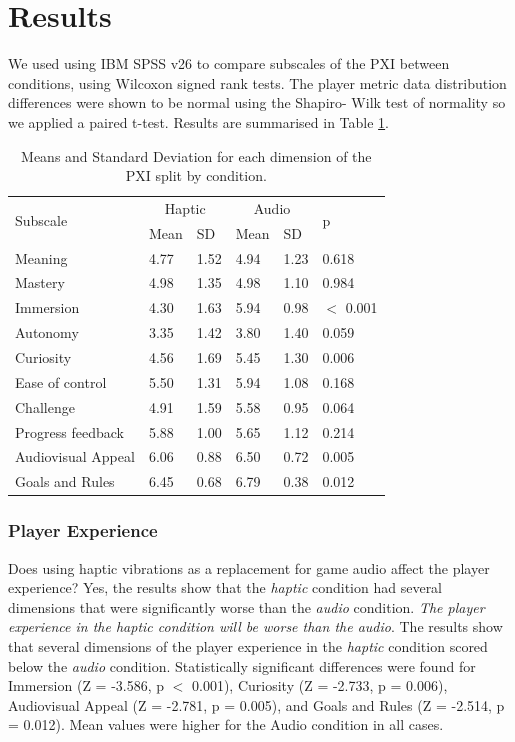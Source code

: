 \documentclass[manuscript,screen]{acmart}
\begin{document}
\section{Results}
We used using IBM SPSS v26 to compare subscales of the PXI between conditions, using Wilcoxon signed rank tests. The player metric data distribution differences were shown to be normal using the Shapiro- Wilk test of normality so we applied a paired t-test. Results are summarised in Table \ref{table:pxi}.


\begin{table}[]
\caption{Means and Standard Deviation for each dimension of the PXI split by condition.}
\label{table:pxi}
\begin{tabular}{|l|l|l|l|l|l|}
\hline
\multirow{2}{*}{Subscale} & \multicolumn{2}{|c|}{Haptic} & \multicolumn{2}{|c|}{Audio} & \multirow{2}{*}{p} \\
\cline{2-5}
& Mean & SD & Mean & SD &\\
\hline
Meaning & 4.77 & 1.52 & 4.94 & 1.23 & 0.618\\
Mastery & 4.98 & 1.35 & 4.98 & 1.10 & 0.984\\
Immersion & 4.30 & 1.63 & 5.94 & 0.98 & $<$ 0.001\\
Autonomy & 3.35 & 1.42 & 3.80 & 1.40 & 0.059 \\
Curiosity & 4.56 & 1.69 & 5.45 & 1.30 & 0.006\\
Ease of control & 5.50 & 1.31 & 5.94 & 1.08 & 0.168 \\
Challenge & 4.91 & 1.59 & 5.58 & 0.95 & 0.064\\
Progress feedback & 5.88 & 1.00 & 5.65 & 1.12 & 0.214\\
Audiovisual Appeal & 6.06 & 0.88 & 6.50 & 0.72 & 0.005\\
Goals and Rules& 6.45 & 0.68 & 6.79 & 0.38 & 0.012\\
\hline

\end{tabular}
\end{table}

\subsubsection{Player Experience}
Does using haptic vibrations as a replacement for game audio affect the player experience? Yes, the results show that the \textit{haptic} condition had several dimensions that were significantly worse than the \textit{audio} condition. \textit{The player experience in the \textit{haptic} condition will be worse than the \textit{audio}}. The results show that several dimensions of the player experience in the \textit{haptic} condition scored below the \textit{audio} condition. Statistically significant differences were found for Immersion (Z = -3.586, p $<$ 0.001), Curiosity (Z = -2.733, p = 0.006), Audiovisual Appeal (Z = -2.781, p  = 0.005), and Goals and Rules (Z = -2.514, p  = 0.012). Mean values were higher for the Audio condition in all cases.
 
\end{document}
